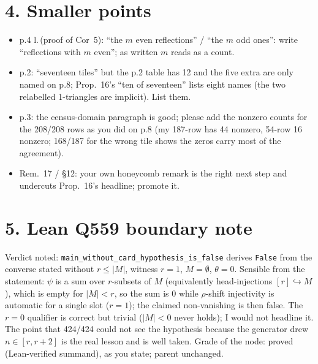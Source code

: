 \documentclass[11pt]{article}
\begin{document}
\section*{4. Smaller points}
\begin{itemize}\itemsep0pt
\item p.4 l.\,(proof of Cor~5): ``the $m$ even reflections'' / ``the $m$ odd ones'': write ``reflections with $m$ even''; as written $m$ reads as a count.
\item p.2: ``seventeen tiles'' but the p.2 table has 12 and the five extra are only named on p.8; Prop.~16's ``ten of seventeen'' lists eight names (the two relabelled 1-triangles are implicit). List them.
\item p.3: the census-domain paragraph is good; please add the nonzero counts for the 208/208 rows as you did on p.8 (my 187-row has 44 nonzero, 54-row 16 nonzero; 168/187 for the wrong tile shows the zeros carry most of the agreement).
\item Rem.~17 / \S12: your own honeycomb remark is the right next step and undercuts Prop.~16's headline; promote it.
\end{itemize}

\section*{5. Lean Q559 boundary note}
Verdict noted: \texttt{main\_without\_card\_hypothesis\_is\_false} derives \texttt{False} from the converse stated without $r\le|M|$, witness $r=1$, $M=\emptyset$, $\theta=0$. Sensible from the statement: $\psi$ is a sum over $r$-subsets of $M$ (equivalently head-injections $[r]\hookrightarrow M$), which is empty for $|M|<r$, so the sum is $0$ while $\rho$-shift injectivity is automatic for a single slot ($r=1$); the claimed non-vanishing is then false. The $r=0$ qualifier is correct but trivial ($|M|<0$ never holds); I would not headline it. The point that 424/424 could not see the hypothesis because the generator drew $n\in[r,r+2]$ is the real lesson and is well taken. Grade of the node: proved (Lean-verified summand), as you state; parent unchanged.
\end{document}
